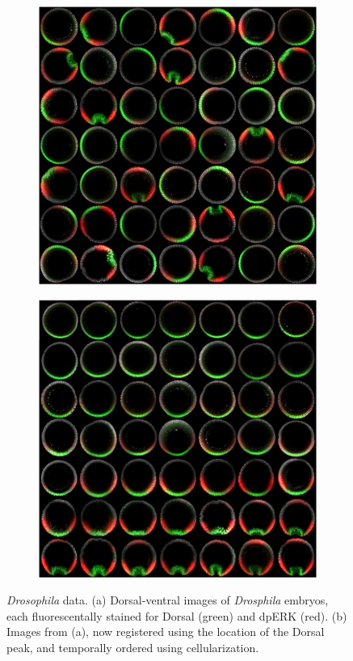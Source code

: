 \documentclass{pnastwo}
\begin{document}
\begin{figure}
\begin{subfigure}{0.25\textwidth}
\includegraphics[width=\textwidth]{fig2a}
\caption{}
\label{subfig:images_scrambled}
\end{subfigure}
\begin{subfigure}{0.25\textwidth}
\includegraphics[width=\textwidth]{fig2b}
\caption{}
\label{subfig:images_hand_ordered}
\end{subfigure}
\caption{{\em Drosophila} data. (a) Dorsal-ventral images of {\em Drosphila} embryos, each fluorescentally stained for Dorsal (green) and dpERK (red). (b) Images from (a), now registered using the location of the Dorsal peak, and temporally ordered using cellularization.} 
\label{fig:fluorescent_images}
\end{figure}
\end{document}
